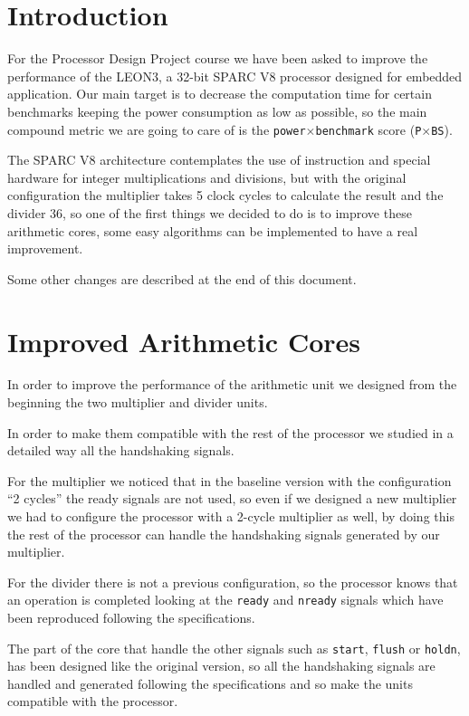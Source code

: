 
\section{Introduction}

For the Processor Design Project course we have been asked to improve the performance of the
LEON3, a 32-bit SPARC V8 processor designed for embedded application.
Our main target is to decrease the computation time for certain benchmarks keeping the power
consumption as low as possible, so the main compound metric we are going to care of is the
\texttt{power}$\times$\texttt{benchmark} score (\texttt{P}$\times$\texttt{BS}).

The SPARC V8 architecture contemplates the use of instruction and special hardware for integer
multiplications and divisions, but with the original configuration the multiplier takes 5 clock cycles
to calculate the result and the divider 36, so one of the first things we decided to do is to improve
these arithmetic cores, some easy algorithms can be implemented to have a real improvement.

Some other changes are described at the end of this document.

\section{Improved Arithmetic Cores}

In order to improve the performance of the arithmetic unit we designed from the beginning the
two multiplier and divider units.

In order to make them compatible with the rest of the processor we studied in a detailed way all
the handshaking signals.

For the multiplier we noticed that in the baseline version with the configuration ``2 cycles'' the
ready signals are not used, so even if we designed a new multiplier we had to configure the
processor with a 2-cycle multiplier as well, by doing this the rest of the processor can handle the
handshaking signals generated by our multiplier.

For the divider there is not a previous configuration, so the processor knows that an operation is
completed looking at the \texttt{ready} and \texttt{nready} signals which have been reproduced following the
specifications.

The part of the core that handle the other signals such as \texttt{start}, \texttt{flush} or \texttt{holdn}, has been designed
like the original version, so all the handshaking signals are handled and generated following the
specifications and so make the units compatible with the processor.